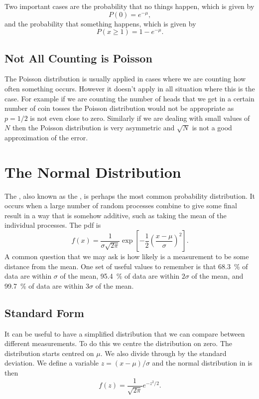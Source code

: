 \documentclass[a4paper]{article}
\begin{document}
    Two important cases are the probability that no things happen, which is given by
    \[P(0) = e^{-\mu},\]
    and the probability that something happens, which is given by
    \[P(x \ge 1) = 1 - e^{-\mu}.\]
    
    \subsection{Not All Counting is Poisson}
    The Poisson distribution is usually applied in cases where we are counting how often something occurs.
    However it doesn't apply in all situation where this is the case.
    For example if we are counting the number of heads that we get in a certain number of coin tosses the Poisson distribution would not be appropriate as \(p = 1/2\) is not even close to zero.
    Similarly if we are dealing with small values of \(N\) then the Poisson distribution is very asymmetric and \(\sqrt{N}\) is not a good approximation of the error.
    
    \section{The Normal Distribution}
    The , also known as the , is perhaps the most common probability distribution.
    It occurs when a large number of random processes combine to give some final result in a way that is somehow additive, such as taking the mean of the individual processes.
    The \gls{pdf} is
    \[f(x) = \frac{1}{\sigma\sqrt{2\pi}}\exp\left[-\frac{1}{2}\left(\frac{x - \mu}{\sigma}\right)^2\right].\]
    A common question that we may ask is how likely is a measurement to be some distance from the mean.
    One set of useful values to remember is that \SI{68.3}{\percent} of data are within \(\sigma\) of the mean, \SI{95.4}{\percent} of data are within \(2\sigma\) of the mean, and \SI{99.7}{\percent} of data are within \(3\sigma\) of the mean.
    
    \subsection{Standard Form}
    It can be useful to have a simplified distribution that we can compare between different measurements.
    To do this we centre the distribution on zero.
    The distribution starts centred on \(\mu\).
    We also divide through by the standard deviation.
    We define a variable \(z = (x - \mu)/\sigma\) and the normal distribution in  is then
    \[f(z) = \frac{1}{\sqrt{2\pi}}e^{-z^2/2}.\]
    
\end{document}

